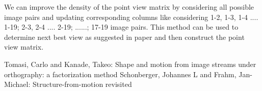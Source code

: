 \documentclass[11pt,twocolumn,pdftex]{article}
\begin{document}
We can improve the density of the point view matrix by considering all possible image pairs and updating corresponding columns like considering 1-2, 1-3, 1-4 .... 1-19; 2-3, 2-4 .... 2-19; ......; 17-19 image pairs. This method can be used to determine next best view as suggested in paper \cite{1} and then construct the point view matrix. 

\begin{thebibliography}{}  
     Tomasi, Carlo and Kanade, Takeo: Shape and motion from image streams under orthography: a factorization method
     Schonberger, Johannes L and Frahm, Jan-Michael: Structure-from-motion revisited
\end{thebibliography}
\end{document}
